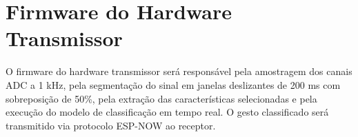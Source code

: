 \section{Firmware do Hardware Transmissor}
O firmware do hardware transmissor será responsável pela amostragem dos canais ADC a 1 kHz, pela segmentação do sinal em janelas deslizantes de 200 ms com sobreposição de 50\%, pela extração das características selecionadas e pela execução do modelo de classificação em tempo real. O gesto classificado será transmitido via protocolo ESP-NOW ao receptor.